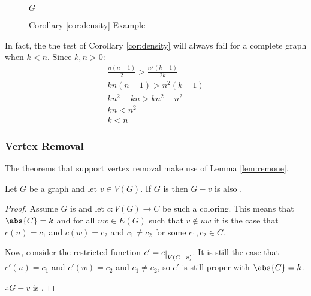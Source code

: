 \begin{figure}[h]
  \label{fig:density}
  \begin{center}

    \bigskip

    \(G\)
  \end{center}
  \caption{Corollary \ref{cor:density} Example}
\end{figure}

In fact, the the test of Corollary \ref{cor:density} will always fail for a complete graph when \(k<n\).  Since
\(k,n>0\):
\begin{gather*}
  \frac{n(n-1)}{2}>\frac{n^2(k-1)}{2k} \\
  kn(n-1)>n^2(k-1) \\
  kn^2-kn>kn^2-n^2 \\
  kn<n^2 \\
  k<n
\end{gather*}

\subsubsection{Vertex Removal}

The theorems that support vertex removal make use of Lemma \ref{lem:remone}.

\begin{lemma}
  \label{lem:remone}
  Let \(G\) be a graph and let \(v\in V(G)\).  If \(G\) is  then \(G-v\) is also .
\end{lemma}

\begin{proof}
  Assume \(G\) is  and let \(c:V(G)\to C\) be such a coloring.  This means that \(\abs{C}=k\) and for
  all \(uw\in E(G)\) such that \(v\notin uw\) it is the case that \(c(u)=c_1\) and \(c(w)=c_2\) and \(c_1\ne c_2\)
  for some \(c_1,c_2\in C\).

  Now, consider the restricted function \(c'=\restrict{c}{V(G-v)}\).  It is still the case that \(c'(u)=c_1\) and
  \(c'(w)=c_2\) and \(c_1\ne c_2\), so \(c'\) is still proper with \(\abs{C}=k\).

  \(\therefore G-v\) is .
\end{proof}

